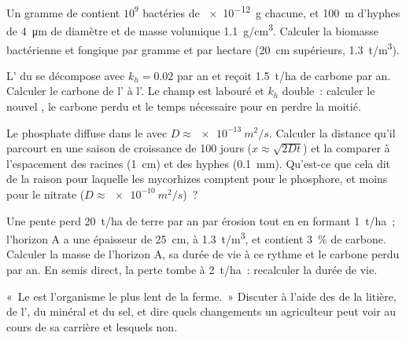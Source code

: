 \begin{exercise}[$\star\star$]\label{exo:b2:living-soil:8}
Un gramme de  contient $10^{9}$ bactéries de \qty{e-12}{g} chacune, et
\qty{100}{m} d'hyphes de \qty{4}{\micro m} de diamètre et de masse
volumique \qty{1.1}{g/cm^3}. Calculer la biomasse bactérienne et fongique
par gramme et par hectare (\qty{20}{cm} supérieurs, \qty{1.3}{t/m^3}).
\end{exercise}

\begin{exercise}[$\star\star$]\label{exo:b2:living-soil:9}
L' du  se décompose avec $k_h = 0.02$ par an et reçoit
\qty{1.5}{t/ha} de carbone par an. Calculer le carbone de l' à
l'. Le champ est labouré et $k_h$ double~: calculer le
nouvel , le carbone perdu et le temps nécessaire pour en
perdre la moitié.
\end{exercise}

\begin{exercise}[$\star\star\star$]\label{exo:b2:living-soil:10}
Le phosphate diffuse dans le  avec $D \approx \qty{e-13}{m^2/s}$.
Calculer la distance qu'il parcourt en une saison de croissance de
\num{100} jours ($x \approx \sqrt{2Dt}$) et la comparer à l'espacement
des racines (\qty{1}{cm}) et des hyphes (\qty{0.1}{mm}). Qu'est-ce que
cela dit de la raison pour laquelle les mycorhizes comptent pour le
phosphore, et moins pour le nitrate ($D \approx \qty{e-10}{m^2/s}$)~?
\end{exercise}

\begin{exercise}[$\star\star\star$]\label{exo:b2:living-soil:11}
Une pente perd \qty{20}{t/ha} de terre par an par érosion tout en en
formant \qty{1}{t/ha}~; l'horizon A a une épaisseur de \qty{25}{cm}, à
\qty{1.3}{t/m^3}, et contient \qty{3}{\%} de carbone. Calculer la masse
de l'horizon A, sa durée de vie à ce rythme et le carbone perdu par an.
En semis direct, la perte tombe à \qty{2}{t/ha}~: recalculer la durée de
vie.
\end{exercise}

\begin{exercise}[$\star\star\star$]\label{exo:b2:living-soil:12}
«~Le  est l'organisme le plus lent de la ferme.~» Discuter à l'aide
des  de la litière, de l', du  minéral et du
sel, et dire quels changements un agriculteur peut voir au cours de sa
carrière et lesquels non.
\end{exercise}

